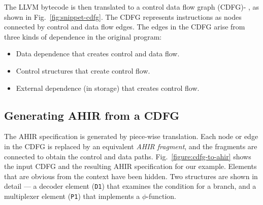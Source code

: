 \documentclass[conference]{IEEEtran}
\begin{document}
\nocite{conditional_branches_rim_jain_1992}
\nocite{DFG_jong_1991}
\nocite{DFG_standard_eijndhoven_1992}
\nocite{flow_graph_orailoglu_1986}
\nocite{functional_synthesis_TASS_amellal_kaminska_1994}

The LLVM bytecode is then translated to a control data flow graph
(CDFG)\cite{conditional_branches_rim_jain_1992}-%
\cite{functional_synthesis_TASS_amellal_kaminska_1994}, as shown in
Fig.~\ref{fig:snippet-cdfg}. The CDFG represents instructions as
nodes connected by control and data flow edges. The edges in the CDFG
arise from three kinds of dependence in the original program:

\begin{itemize}
\item Data dependence that creates control and data flow.
\item Control structures that create control flow.
\item External dependence (in storage) that creates control flow.
\end{itemize}

\subsection{Generating AHIR from a CDFG}

\begin{figure*}
\centering
{}%
\hspace{0.25in}%
%
\hspace{0.25in}%
%
\caption{Translating a CDFG to AHIR.}%
\label{figure:cdfg-to-ahir}%
\end{figure*}

The AHIR specification is generated by piece-wise translation. Each
node or edge in the CDFG is replaced by an equivalent \emph{AHIR
  fragment}, and the fragments are connected to obtain the control and
data paths. Fig.~\ref{figure:cdfg-to-ahir} shows the input CDFG and
the resulting AHIR specification for our example. Elements that are
obvious from the context have been hidden. Two structures are shown in
detail --- a decoder element (\texttt{D1}) that examines the condition
for a branch, and a multiplexer element (\texttt{P1}) that implements
a $\phi$-function.
\end{document}
